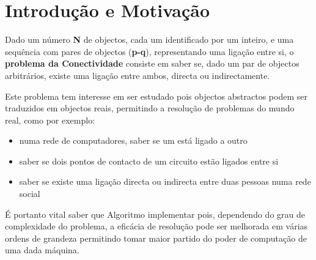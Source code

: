 \documentclass[10pt,a4paper]{article}
\begin{document}




\section{Introdução e Motivaç\~ao}

\par Dado um número \textbf{N} de objectos, cada um identificado por um inteiro, e uma sequência com pares de objectos (\textbf{p-q}), representando uma ligação entre si, o \textbf{problema da Conectividade} consiste em saber se, dado um par de objectos arbitrários, existe uma ligação entre ambos, directa ou indirectamente. 
\par Este problema tem interesse em ser estudado pois objectos abstractos podem ser traduzidos em objectos reais, permitindo a resolução de problemas do mundo real, como por exemplo:
\begin{itemize}
\item numa rede de computadores, saber se um está ligado a outro
\item saber se dois pontos de contacto de um circuito estão ligados entre si
\item saber se existe uma ligação directa ou indirecta entre duas pessoas numa rede social
\end{itemize}
\par É portanto vital saber que Algoritmo implementar pois, dependendo do grau de complexidade do problema, a eficácia de resolução pode ser melhorada em várias ordens de grandeza permitindo tomar maior partido do poder de computação de uma dada máquina.
\end{document}
